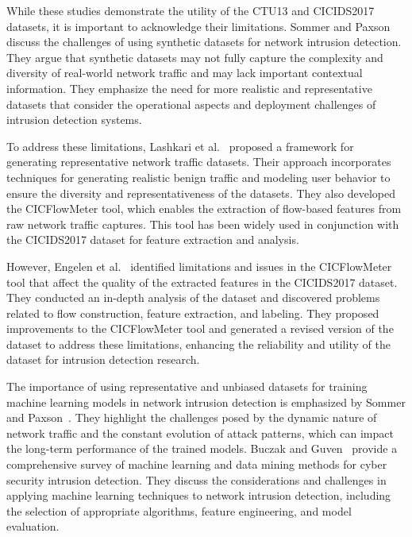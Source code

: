 While these studies demonstrate the utility of the CTU13 and CICIDS2017 datasets, it is important to acknowledge their limitations. Sommer and Paxson~\cite{sommer2010outside} discuss the challenges of using synthetic datasets for network intrusion detection. They argue that synthetic datasets may not fully capture the complexity and diversity of real-world network traffic and may lack important contextual information. They emphasize the need for more realistic and representative datasets that consider the operational aspects and deployment challenges of intrusion detection systems.

To address these limitations, Lashkari et al.~\cite{lashkari2017characterization} proposed a framework for generating representative network traffic datasets. Their approach incorporates techniques for generating realistic benign traffic and modeling user behavior to ensure the diversity and representativeness of the datasets. They also developed the CICFlowMeter tool, which enables the extraction of flow-based features from raw network traffic captures. This tool has been widely used in conjunction with the CICIDS2017 dataset for feature extraction and analysis.

However, Engelen et al.~\cite{engelen2021troubleshooting} identified limitations and issues in the CICFlowMeter tool that affect the quality of the extracted features in the CICIDS2017 dataset. They conducted an in-depth analysis of the dataset and discovered problems related to flow construction, feature extraction, and labeling. They proposed improvements to the CICFlowMeter tool and generated a revised version of the dataset to address these limitations, enhancing the reliability and utility of the dataset for intrusion detection research.

The importance of using representative and unbiased datasets for training machine learning models in network intrusion detection is emphasized by Sommer and Paxson~\cite{sommer2010outside}. They highlight the challenges posed by the dynamic nature of network traffic and the constant evolution of attack patterns, which can impact the long-term performance of the trained models. Buczak and Guven~\cite{buczak2015survey} provide a comprehensive survey of machine learning and data mining methods for cyber security intrusion detection. They discuss the considerations and challenges in applying machine learning techniques to network intrusion detection, including the selection of appropriate algorithms, feature engineering, and model evaluation.

